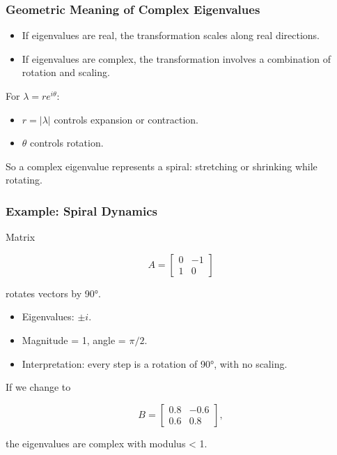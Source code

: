 \documentclass[
  letterpaper,
  DIV=11,
  numbers=noendperiod]{scrreprt}
\providecommand{\tightlist}{%
  \setlength{\itemsep}{0pt}\setlength{\parskip}{0pt}}
\begin{document}
\subsubsection{Geometric Meaning of Complex
Eigenvalues}\label{geometric-meaning-of-complex-eigenvalues}

\begin{itemize}
\tightlist
\item
  If eigenvalues are real, the transformation scales along real
  directions.
\item
  If eigenvalues are complex, the transformation involves a combination
  of rotation and scaling.
\end{itemize}

For \(\lambda = re^{i\theta}\):

\begin{itemize}
\tightlist
\item
  \(r = |\lambda|\) controls expansion or contraction.
\item
  \(\theta\) controls rotation.
\end{itemize}

So a complex eigenvalue represents a spiral: stretching or shrinking
while rotating.

\subsubsection{Example: Spiral Dynamics}\label{example-spiral-dynamics}

Matrix

\[
A = \begin{bmatrix} 0 & -1 \\ 1 & 0 \end{bmatrix}
\]

rotates vectors by 90°.

\begin{itemize}
\tightlist
\item
  Eigenvalues: \(\pm i\).
\item
  Magnitude = 1, angle = \(\pi/2\).
\item
  Interpretation: every step is a rotation of 90°, with no scaling.
\end{itemize}

If we change to

\[
B = \begin{bmatrix} 0.8 & -0.6 \\ 0.6 & 0.8 \end{bmatrix},
\]

the eigenvalues are complex with modulus \textless{} 1.
\end{document}
